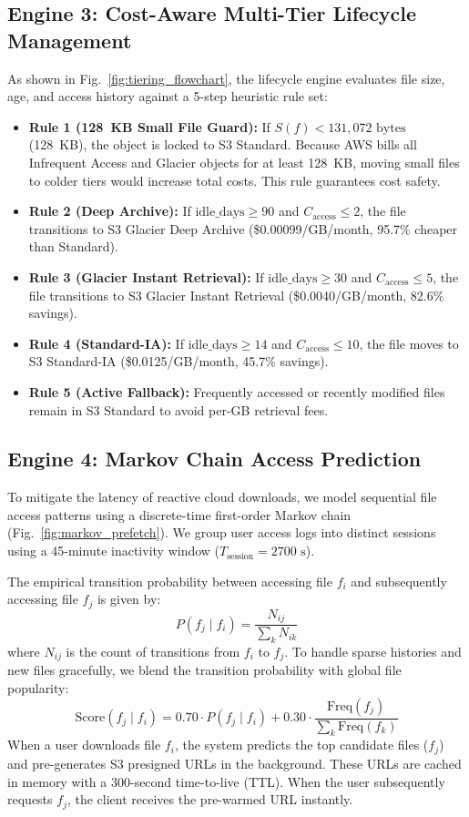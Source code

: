 \documentclass[conference]{IEEEtran}
\begin{document}
\subsection{Engine 3: Cost-Aware Multi-Tier Lifecycle Management}
As shown in Fig.~\ref{fig:tiering_flowchart}, the lifecycle engine evaluates file size, age, and access history against a 5-step heuristic rule set:
\begin{itemize}
    \item \textbf{Rule 1 (128~KB Small File Guard):} If $S(f) < 131,072\text{ bytes}$ (128~KB), the object is locked to S3 Standard. Because AWS bills all Infrequent Access and Glacier objects for at least 128~KB, moving small files to colder tiers would increase total costs. This rule guarantees cost safety.
    \item \textbf{Rule 2 (Deep Archive):} If $\text{idle\_days} \ge 90$ and $C_{\text{access}} \le 2$, the file transitions to S3 Glacier Deep Archive (\$0.00099/GB/month, 95.7\% cheaper than Standard).
    \item \textbf{Rule 3 (Glacier Instant Retrieval):} If $\text{idle\_days} \ge 30$ and $C_{\text{access}} \le 5$, the file transitions to S3 Glacier Instant Retrieval (\$0.0040/GB/month, 82.6\% savings).
    \item \textbf{Rule 4 (Standard-IA):} If $\text{idle\_days} \ge 14$ and $C_{\text{access}} \le 10$, the file moves to S3 Standard-IA (\$0.0125/GB/month, 45.7\% savings).
    \item \textbf{Rule 5 (Active Fallback):} Frequently accessed or recently modified files remain in S3 Standard to avoid per-GB retrieval fees.
\end{itemize}

\subsection{Engine 4: Markov Chain Access Prediction}
To mitigate the latency of reactive cloud downloads, we model sequential file access patterns using a discrete-time first-order Markov chain (Fig.~\ref{fig:markov_prefetch}). We group user access logs into distinct sessions using a 45-minute inactivity window ($T_{\text{session}} = 2700\text{ s}$).

The empirical transition probability between accessing file $f_i$ and subsequently accessing file $f_j$ is given by:
\begin{equation}
P(f_j \mid f_i) = \frac{N_{ij}}{\sum_k N_{ik}}
\end{equation}
where $N_{ij}$ is the count of transitions from $f_i$ to $f_j$. To handle sparse histories and new files gracefully, we blend the transition probability with global file popularity:
\begin{equation}
\text{Score}(f_j \mid f_i) = 0.70 \cdot P(f_j \mid f_i) + 0.30 \cdot \frac{\text{Freq}(f_j)}{\sum_k \text{Freq}(f_k)}
\end{equation}
When a user downloads file $f_i$, the system predicts the top candidate files ($f_j$) and pre-generates S3 presigned URLs in the background. These URLs are cached in memory with a 300-second time-to-live (TTL). When the user subsequently requests $f_j$, the client receives the pre-warmed URL instantly.
\end{document}
